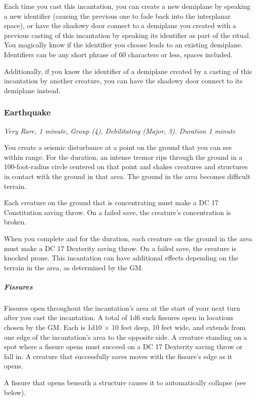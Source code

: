 Each time you cast this incantation, you can create a new demiplane by speaking a new identifier (causing the previous one to fade back into the interplanar space), or have the shadowy door connect to a demiplane you created with a previous casting of this incantation by speaking its identifier as part of the ritual. You magically know if the identifier you choose leads to an existing demiplane. Identifiers can be any short phrase of 60 characters or less, spaces included.

Additionally, if you know the identifier of a demiplane created by a casting of this incantation by another creature, you can have the shadowy door connect to its demiplane instead.

\subsubsection{Earthquake}\label{inc:earthquake}
\textit{Very Rare, 1 minute, Group (4), Debilitating (Major, 3). Duration 1 minute}

You create a seismic disturbance at a point on the ground that you can see within range. For the duration, an intense tremor rips through the ground in a 100-foot-radius circle centered on that point and shakes creatures and structures in contact with the ground in that area. The ground in the area becomes difficult terrain.

Each creature on the ground that is concentrating must make a DC 17 Constitution saving throw. On a failed save, the creature's concentration is broken.

When you complete and for the duration, each creature on the ground in the area must make a DC 17 Dexterity saving throw. On a failed save, the creature is knocked prone. This incantation can have additional effects depending on the terrain in the area, as determined by the GM.

\subparagraph*{Fissures} Fissures open throughout the incantation's area at the start of your next turn after you cast the incantation. A total of 1d6 such fissures open in locations chosen by the GM. Each is 1d10 × 10 feet deep, 10 feet wide, and extends from one edge of the incantation's area to the opposite side. A creature standing on a spot where a fissure opens must succeed on a DC 17 Dexterity saving throw or fall in. A creature that successfully saves moves with the fissure's edge as it opens.

A fissure that opens beneath a structure causes it to automatically collapse (see below).

